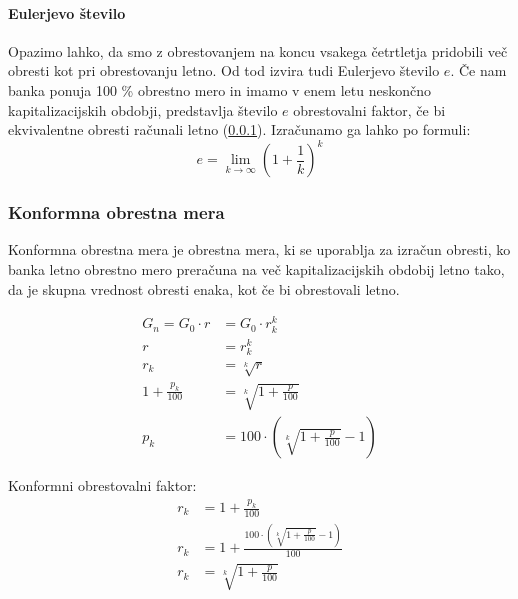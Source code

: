 \documentclass[12pt]{article}
\begin{document}
        \paragraph{Eulerjevo število} 
            \label{euler}
            Opazimo lahko, da smo z obrestovanjem na koncu vsakega četrtletja pridobili več obresti
            kot pri obrestovanju letno. Od tod izvira tudi Eulerjevo število $e$. Če nam 
            banka ponuja 100 \% obrestno mero in imamo v enem letu neskončno kapitalizacijskih 
            obdobji, predstavlja število $e$ obrestovalni faktor, če bi ekvivalentne obresti 
            računali letno (\ref{konformna}). Izračunamo ga lahko po formuli: \hfill \cite{wiki:euler}
            \begin{equation}
                e = \lim_{k \to \infty} (1 + \frac{1}{k})^k
            \end{equation}

        \subsubsection{Konformna obrestna mera}
        \label{konformna}
        Konformna obrestna mera je obrestna mera, ki se uporablja za izračun obresti, ko
        banka letno obrestno mero preračuna na več kapitalizacijskih obdobij letno tako, da
        je skupna vrednost obresti enaka, kot če bi obrestovali letno.
        
        \begin{equation}
            \begin{split}
                G_n = G_0 \cdot r & = G_0 \cdot r_k^k \\
                r & = r_k^k \\
                r_k & = \sqrt[k]{r} \\
                1 + \frac{p_k}{100} & = \sqrt[k]{1 + \frac{p}{100}} \\
                p_k & = 100 \cdot (\sqrt[k]{1 + \frac{p}{100}} - 1)
            \end{split}
        \end{equation}

        Konformni obrestovalni faktor:
        \begin{equation}
            \begin{split}
                r_k & = 1 + \frac{p_k}{100} \\
                r_k & = 1 + \frac{100 \cdot (\sqrt[k]{1 + \frac{p}{100}} - 1)}{100} \\
                r_k & = \sqrt[k]{1 + \frac{p}{100}}
            \end{split}
        \end{equation}
\end{document}
